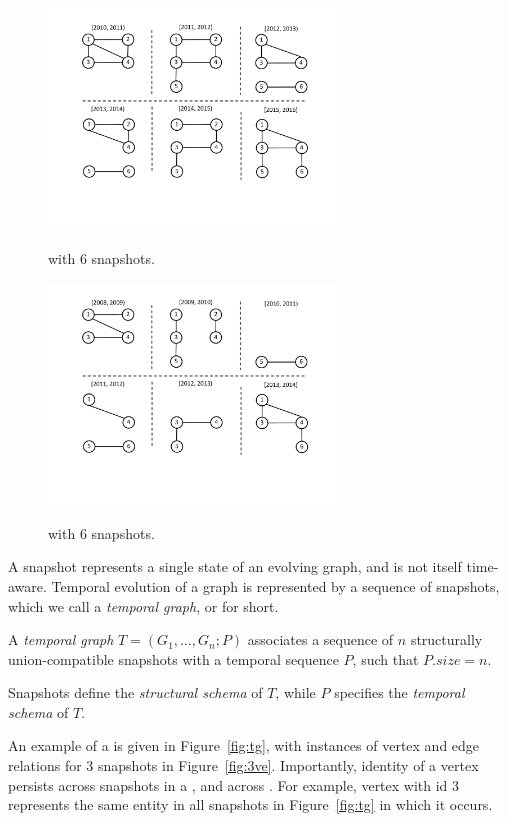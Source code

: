 \begin{figure}[th!]
\centering
\begin{minipage}{3.3in}
  \centering
  \includegraphics[width=3in]{figs/6snaps.pdf}
  \caption{\tg {} with 6 snapshots.}{}
  \label{fig:tg}
\end{minipage}%
\begin{minipage}{3.3in}
  \centering
  \includegraphics[width=3in]{figs/t2.pdf}
  \caption{\tg {} with 6 snapshots.}{}
  \label{fig:tg_t2}
\end{minipage}
\end{figure}


A snapshot represents a single state of an evolving graph, and is not
itself time-aware.  Temporal evolution of a graph is represented by a
sequence of snapshots, which we call a {\em temporal graph}, or \tg
for short.

\begin{definition} [TGraph]
A {\em temporal graph} $T = (G_1, \ldots, G_n; P)$ associates a
sequence of $n$ structurally union-compatible snapshots with a
temporal sequence $P$, such that $P.size = n$.
\label{def:tgraph} 
\end{definition}

Snapshots define the {\em structural schema} of $T$, while $P$
specifies the {\em temporal schema} of $T$.

An example of a \tg is given in Figure~\ref{fig:tg}, with instances of
vertex and edge relations for 3 snapshots in Figure~\ref{fig:3ve}.
Importantly, identity of a vertex persists across snapshots in a \tg,
and across \tgs.  For example, vertex with id $3$ represents the same
entity in all snapshots in Figure~\ref{fig:tg} in which it occurs.

